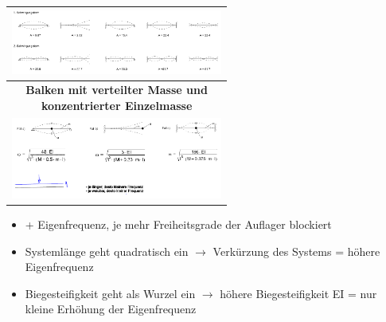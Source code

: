 \begin{minipage}{\linewidth}
\begin{tabular}{l|l|p{0.25\linewidth}p{0.3\linewidth}}
			\multicolumn{4}{c}{\includegraphics[width=\linewidth]{images/Schwingung2Schwingungsform.PNG} } \\ \hline
			
			\multicolumn{4}{c}{\textbf{Balken mit verteilter Masse und konzentrierter Einzelmasse } } \\ \hline
			
			\multicolumn{4}{c}{ \includegraphics[width=0.8\linewidth]{images/Schwingung3Schwingungsform.PNG} } \\ \hline
		
		\end{tabular}
		
	\end{minipage}
	\begin{minipage}{0.5\linewidth}
		
		\begin{itemize}
			\item + Eigenfrequenz, je mehr Freiheitsgrade der Auflager blockiert
			
			\item Systemlänge geht quadratisch ein $ \rightarrow $ Verkürzung des Systems = höhere Eigenfrequenz
			
			\item Biegesteifigkeit geht als Wurzel ein $ \rightarrow $ höhere Biegesteifigkeit EI = nur kleine Erhöhung der Eigenfrequenz
			
		\end{itemize}
		
	\end{minipage}